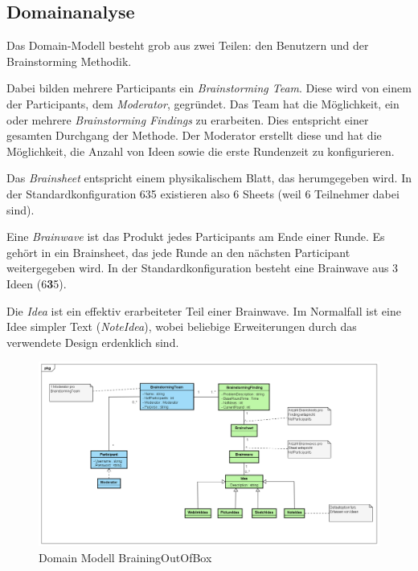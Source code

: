 \subsection{Domainanalyse}

Das Domain-Modell besteht grob aus zwei Teilen: den Benutzern und der Brainstorming Methodik. 

Dabei bilden mehrere Participants ein \textit{Brainstorming Team}. Diese wird von einem der Participants, dem \textit{Moderator}, gegründet.  Das Team hat die Möglichkeit, ein oder mehrere \textit{Brainstorming Findings} zu erarbeiten. Dies entspricht einer gesamten Durchgang der Methode. Der Moderator erstellt diese und hat die Möglichkeit, die Anzahl von Ideen sowie die erste Rundenzeit zu konfigurieren. 

Das \textit{Brainsheet} entspricht einem physikalischem Blatt, das herumgegeben wird. In der Standardkonfiguration 635 existieren also 6 Sheets (weil 6 Teilnehmer dabei sind).

Eine \textit{Brainwave} ist das Produkt jedes Participants am Ende einer Runde. Es gehört in ein Brainsheet, das jede Runde an den nächsten Participant weitergegeben wird. In der Standardkonfiguration besteht eine Brainwave aus 3 Ideen (6\textbf{3}5).

Die \textit{Idea} ist ein effektiv erarbeiteter Teil einer Brainwave. Im Normalfall ist eine Idee simpler Text (\textit{NoteIdea}), wobei beliebige Erweiterungen durch das verwendete Design erdenklich sind. 
\begin{figure}[h]
	\centering
	\includegraphics[width=1\linewidth]{img/domain-analyse/DomainModell-Methode635}
	\caption{Domain Modell BrainingOutOfBox}
	\label{fig:domainmodell-methode635}
\end{figure}
